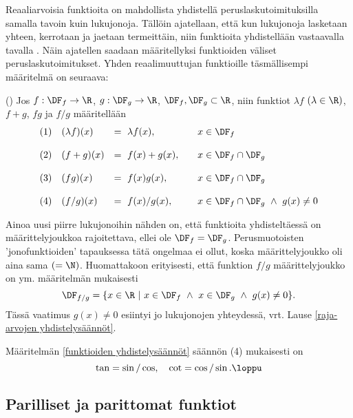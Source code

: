 Reaaliarvoisia funktioita on mahdollista yhdistellä peruslaskutoimituksilla samalla tavoin kuin 
lukujonoja. Tällöin ajatellaan, että kun lukujonoja lasketaan yhteen, kerrotaan ja jaetaan 
termeittäin, niin funktioita yhdistellään vastaavalla tavalla . Näin ajatellen
saadaan määritellyksi funktioiden väliset peruslaskutoimitukset. Yhden reaalimuuttujan
funktioille täsmällisempi määritelmä on seuraava:
\begin{Def} () \label{funktioiden yhdistelysäännöt}
Jos $f:\DF_f \rightarrow \R$, $g:\DF_g\rightarrow\R$, $\DF_f,\DF_g \subset \R$, niin funktiot
$\lambda f$ $(\lambda\in\R)$, $f+g$, $fg$ ja $f/g$ määritellään
\[
\begin{array}{clll}
(1) & (\lambda f)(x)&=\ \lambda f(x), \quad & x \in \DF_f \\ \\
(2) & (f+g)(x)&=\ f(x)+g(x), \quad & x\in \DF_f \cap \DF_g \\ \\ 
(3) & (fg)(x)&=\ f(x)g(x), \quad & x\in \DF_f \cap \DF_g \\ \\
(4) & (f/g)(x)&=\ f(x)/g(x), \quad & x\in \DF_f \cap \DF_g\ \wedge\ g(x) \neq 0
\end{array} 
\]
\end{Def}
Ainoa uusi piirre lukujonoihin nähden on, että funktioita yhdisteltäessä on määrittelyjoukkoa 
rajoitettava, ellei ole $\DF_f=\DF_g$. Perusmuotoisten 'jonofunktioiden' tapauksessa tätä
ongelmaa ei ollut, koska määrittelyjoukko oli aina sama $(=\N)$. Huomattakoon erityisesti, että
funktion $f/g$ määrittelyjoukko on ym. määritelmän mukaisesti
\[
\DF_{f/g}=\{x\in\R \ | \ x\in\DF_f\ \wedge\ x\in\DF_g\ \wedge\ g(x)\neq 0\}.
\]
Tässä vaatimus $g(x)\neq 0$ esiintyi jo lukujonojen yhteydessä, vrt. Lause 
\ref{raja-arvojen yhdistelysäännöt}.
\begin{Exa}
Määritelmän \ref{funktioiden yhdistelysäännöt} säännön (4) mukaisesti on
\[
\tan=\sin/\cos, \quad \cot = \cos/\sin. \loppu
\]
\end{Exa}

\subsection*{Parilliset ja parittomat funktiot}

